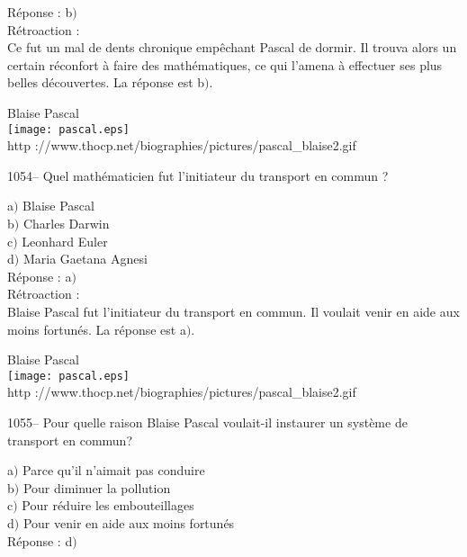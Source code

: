 ﻿\documentclass[letterpaper, 12pt]{article}
\begin{document}
R\'eponse : b$)$\\

R\'etroaction : \\
Ce fut un mal de dents chronique emp\^echant Pascal de dormir. Il
trouva alors un certain r\'econfort \`a faire des math\'ematiques,
ce qui l'amena \`a effectuer ses plus belles d\'ecouvertes.
La r\'eponse est b$)$.\\

        \begin{center}
        Blaise Pascal\\
    \texttt{[image: pascal.eps]}\\
        {\footnotesize http
://www.thocp.net/biographies/pictures/pascal\_blaise2.gif}
    \end{center}

1054-- Quel math\'ematicien fut l'initiateur du transport en commun
?

a$)$ Blaise Pascal \\
b$)$ Charles Darwin  \\
c$)$ Leonhard Euler  \\
d$)$ Maria Gaetana Agnesi\\

R\'eponse : a$)$\\

R\'etroaction : \\
Blaise Pascal fut l'initiateur du transport en commun. Il voulait
venir en aide aux moins fortun\'es.
La r\'eponse est a$)$.\\

        \begin{center}
        Blaise Pascal\\
    \texttt{[image: pascal.eps]}\\
        {\footnotesize http
://www.thocp.net/biographies/pictures/pascal\_blaise2.gif}
    \end{center}

1055-- Pour quelle raison Blaise Pascal voulait-il instaurer un
syst\`eme de transport en commun?

a$)$ Parce qu'il n'aimait pas conduire \\
b$)$ Pour diminuer la pollution \\
c$)$ Pour r\'eduire les embouteillages  \\
d$)$ Pour venir en aide aux moins fortun\'es \\

R\'eponse : d$)$\\
\end{document}
